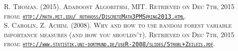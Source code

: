 \documentclass[11pt]{article}
\begin{document}
\begin{thebibliography}{99\kern\bibindent}
\textsc{R. Thomas. (2015). Adaboost Algorithm, MIT. Retrieved on Dec 7th, 2015 from: \href{http://math.mit.edu/~rothvoss/DiscreteMath3PMSpring2013.html}{\texttt{http://math.mit.edu/~rothvoss/DiscreteMath3PMSpring2013.html}}.}\\
[0.2cm]

\textsc{S. Carolin, Z. Achim. (2008). Why and how to use random forest variable importance measures (and how you shouldn't). Retrieved on Dec 7th, 2015 from: \href{http://www.statistik.uni-dortmund.de/useR-2008/slides/Strobl+Zeileis.pdf}{\texttt{http://www.statistik.uni-dortmund.de/useR-2008/slides/Strobl+Zeileis.pdf}}. }\\
[0.2cm]

\end{thebibliography}
\end{document}
